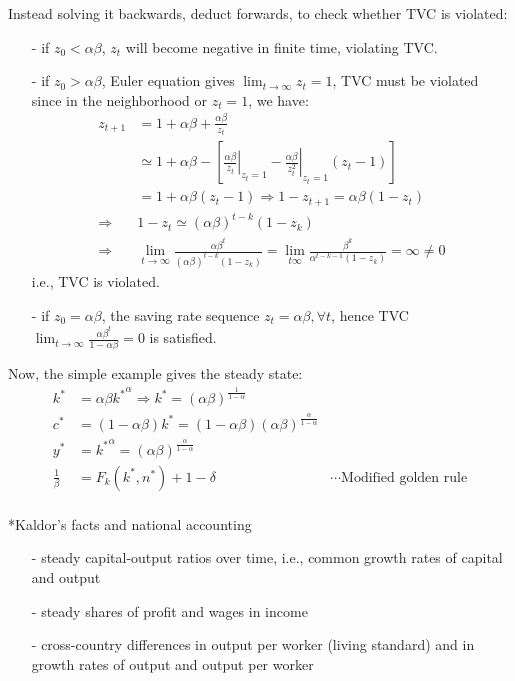 \documentclass[10pt,landscape,a4paper]{article}
\makeatletter
\renewcommand{\subsection}{\@startsection{subsection}{1}{0mm}{.2ex}{.2ex}{\small\bfseries}}
\makeatother
\begin{document}
\begin{multicols*}{3}
Instead solving it backwards, deduct forwards, to check whether TVC is violated:
\begin{itemize}
    \item[-] if $z_0<\alpha\beta$, $z_t$ will become negative in finite time, violating TVC.
    \item[-] if $z_0>\alpha\beta$, Euler equation gives $\lim_{t\rightarrow \infty}z_t=1$, TVC must be violated since in the neighborhood or $z_t=1$, we have:
    \begin{align*}
        z_{t+1}&=1+\alpha\beta +\frac{\alpha\beta}{z_t}\\
        &\simeq 1+\alpha\beta - \left[\left.\frac{\alpha\beta}{z_t}\right\vert_{z_t=1} - \left.\frac{\alpha\beta}{z_t^2}\right\vert_{z_t=1}(z_t-1)\right]\\
        & = 1+\alpha\beta(z_t-1)\Rightarrow 1-z_{t+1}=\alpha\beta(1-z_t) \\
        \Rightarrow & 1-z_t \simeq (\alpha\beta)^{t-k}(1-z_k)\\
        \Rightarrow & \lim_{t\rightarrow\infty}\frac{\alpha\beta^t}{(\alpha\beta)^{t-k}(1-z_k)}=\lim_{t\infty}\frac{\beta^k}{\alpha^{t-k-1}(1-z_k)}=\infty\neq 0
    \end{align*}
    i.e., TVC is violated.
    \item[-] if $z_0=\alpha\beta$, the saving rate sequence $z_t=\alpha\beta,\forall t$, hence TVC $\lim_{t\rightarrow\infty}\frac{\alpha\beta^t}{1-\alpha\beta}=0$ is satisfied.
\end{itemize}

Now, the simple example gives the steady state:
\begin{align*}
    k^*& = \alpha \beta {k^*}^{\alpha} \Rightarrow k^* = (\alpha\beta)^{\frac{1}{1-\alpha}}\\
    c^* &= (1-\alpha\beta)k^* = (1-\alpha\beta)(\alpha\beta)^{\frac{\alpha}{1-\alpha}}\\
    y^* &= {k^*}^{\alpha}=(\alpha\beta)^{\frac{\alpha}{1-\alpha}}\\
    \frac{1}{\beta} & =F_k(k^*,n^*)+1-\delta &\cdots\text{Modified golden rule}\\
\end{align*}

\subsection*{Kaldor's facts and national accounting}
\begin{itemize}
    \item[-] steady capital-output ratios over time, i.e., common growth rates of capital and output
    \item[-] steady shares of profit and wages in income
    \item[-] cross-country differences in  output per worker (living standard) and in growth rates of output and output per worker
\end{itemize}


\end{multicols*}
\end{document}
